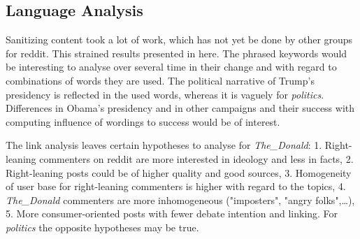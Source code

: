 \documentclass[runningheads,a4paper]{llncs}
\begin{document}
	\subsection{Language Analysis}\label{sub:LanguageDiscussion}
	Sanitizing content took a lot of work, which has not yet be done by other groups for reddit. This strained results presented in here.
	The phrased keywords would be interesting to analyse over several time in their change and with regard to combinations of words they are used. The political narrative of Trump's presidency is reflected in the used words, whereas it is vaguely for \textit{politics}.
	Differences in Obama's presidency and in other campaigns and their success with computing influence of wordings to success would be of interest.\par
	The link analysis leaves certain hypotheses to analyse for \textit{The\_Donald}: 1. Right-leaning commenters on reddit are more interested in ideology and less in facts, 2. Right-leaning posts could be of higher quality and good sources, 3. Homogeneity of user base for right-leaning commenters is higher with regard to the topics, 4. \textit{The\_Donald} commenters are more inhomogeneous ("imposters", "angry folks",\ldots), 5. More consumer-oriented posts with fewer debate intention and linking.
	For \textit{politics} the opposite hypotheses may be true.%
\end{document}
